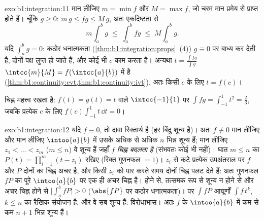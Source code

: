 \begin{solution}{exo:b1:integration:11}
मान लीजिए $m = \min f$ और $M = \max f$, जो चरम मान प्रमेय से प्राप्त होते
हैं। चूँकि $g \geq 0$: $m\,g \leq fg \leq M\,g$, अतः एकदिष्टता से
\[
m \int_a^b g \;\leq\; \int_a^b fg \;\leq\; M \int_a^b g .
\]
यदि $\int_a^b g = 0$: कठोर धनात्मकता (\cref{thm:b1:integration:props}~(4))
$g \equiv 0$ पर बाध्य कर देती है, दोनों पक्ष लुप्त हो जाते हैं, और कोई भी
$c$ काम करता है। अन्यथा $t = \frac{\int fg}{\int g}$ $\intcc{m}{M} =
f(\intcc{a}{b})$ में है
(\cref{thm:b1:continuity:evt,thm:b1:continuity:ivt}), अतः किसी $c$ के लिए $t
= f(c)$।

चिह्न महत्त्व रखता है: $f(t) = g(t) = t$ वाले $\intcc{-1}{1}$ पर $\int fg =
\int_{-1}^1 t^2 = \frac23$, जबकि प्रत्येक $c$ के लिए $f(c)\int_{-1}^1 t\,\dd
t = 0$।
\end{solution}

\begin{solution}{exo:b1:integration:12}
यदि $f \equiv 0$, तो दावा रिक्तार्थ है (हर बिंदु शून्य है)। अतः $f
\not\equiv 0$ मान लीजिए और मान लीजिए $\intoo{a}{b}$ में उसके अधिक से अधिक
$n$ भिन्न शून्य हैं; मान लीजिए $z_1 < \dots < z_m$ ($m \leq n$) वे शून्य हैं
जहाँ $f$ \emph{चिह्न बदलता है} (संभवतः कोई भी नहीं)। घात $m \leq n$ का $P(t)
= \prod_{i=1}^{m}(t - z_i)$ रखिए (रिक्त गुणनफल $= 1$)। $z_i$ से कटे प्रत्येक
उपअंतराल पर $f$ और $P$ दोनों का चिह्न अचर है, और किसी $z_i$ को पार करते समय
दोनों चिह्न पलट देते हैं: अतः गुणनफल $fP$ का पूरे $\intoo{a}{b}$ पर एक ही
अचर चिह्न है।  होने से, तत्समक रूप से शून्य न होने से और अचर चिह्न होने
से $\bigl|\int_a^b fP\bigr| > 0$ ($\abs{fP}$ पर कठोर धनात्मकता)। पर $\int f
P$ आघूर्णों $\int f\,t^k$, $k \leq n$ का रैखिक संयोजन है, और वे सब शून्य
हैं: विरोधाभास। अतः $f$ के $\intoo{a}{b}$ में कम से कम $n + 1$ भिन्न शून्य
हैं।
\end{solution}

